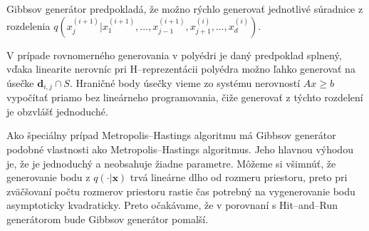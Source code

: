Gibbsov generátor predpokladá, že možno rýchlo generovať jednotlivé súradnice z rozdelenia $q(x^{(i+1)}_j|x^{(i+1)}_1, \dots, x^{(i+1)}_{j-1}, x^{(i)}_{j+1}, \dots, x^{(i)}_d)$.

V prípade rovnomerného generovania v polyédri je daný predpoklad splnený, vďaka linearite nerovníc pri H--reprezentácii polyédra možno ľahko generovať na úsečke $\mathbf d_{i,j} \cap S$. Hraničné body úsečky vieme zo systému nerovností $Ax \geq b$ vypočítať priamo bez lineárneho programovania, čiže generovať z týchto rozdelení je obzvlášť jednoduché.

Ako špeciálny prípad Metropolis--Hastings algoritmu má Gibbsov generátor podobné vlastnosti ako Metropolis--Hastings algoritmus. Jeho hlavnou výhodou je, že je jednoduchý a neobsahuje žiadne parametre. Môžeme si všimnúť, že generovanie bodu z $q(\cdot|\mathbf x)$ trvá lineárne dlho od rozmeru priestoru, preto pri zväčšovaní počtu rozmerov priestoru rastie čas potrebný na vygenerovanie bodu asymptoticky kvadraticky. Preto očakávame, že v porovnaní s Hit--and--Run generátorom bude Gibbsov generátor pomalší.
